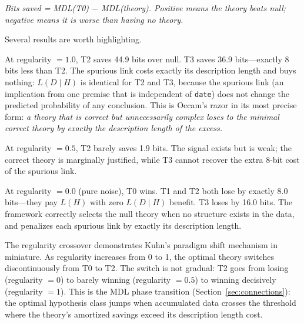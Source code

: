 \textit{Bits saved = MDL(T0) $-$ MDL(theory). Positive means the
theory beats null; negative means it is worse than having no theory.}

Several results are worth highlighting.

At regularity $= 1.0$, T2 saves 44.9 bits over null. T3 saves 36.9
bits---exactly 8 bits less than T2. The spurious link costs exactly
its description length and buys nothing: $L(D \mid H)$ is identical
for T2 and T3, because the spurious link (an implication from one
premise that is independent of \texttt{date}) does not change the
predicted probability of any conclusion. This is Occam's razor in its
most precise form: \emph{a theory that is correct but unnecessarily
complex loses to the minimal correct theory by exactly the description
length of the excess.}

At regularity $= 0.5$, T2 barely saves 1.9 bits. The signal exists
but is weak; the correct theory is marginally justified, while T3
cannot recover the extra 8-bit cost of the spurious link.

At regularity $= 0.0$ (pure noise), T0 wins. T1 and T2 both lose by
exactly 8.0 bits---they pay $L(H)$ with zero $L(D \mid H)$ benefit.
T3 loses by 16.0 bits. The framework correctly selects the null theory
when no structure exists in the data, and penalizes each spurious link
by exactly its description length.

The regularity crossover demonstrates Kuhn's paradigm shift mechanism
in miniature. As regularity increases from 0 to 1, the optimal theory
switches discontinuously from T0 to T2. The switch is not gradual: T2
goes from losing (regularity $= 0$) to barely winning (regularity $=
0.5$) to winning decisively (regularity $= 1$). This is the MDL phase
transition (Section~\ref{sec:connections}): the optimal hypothesis
class jumps when accumulated data crosses the threshold where the
theory's amortized savings exceed its description length cost.